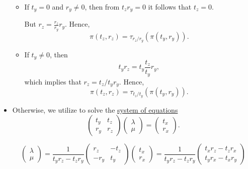 \begin{defproof}
\begin{itemize}
\begin{itemize}
      \item If \( t_y = 0 \) and \( r_y \neq 0 \), then from \( t_z r_y = 0 \) it follows that \( t_z = 0 \).

      But \( r_z = \frac {r_z} {r_y} r_y \). Hence,
      \begin{equation*}
        \pi(t_z, r_z) = \tau_{r_z / r_y}(\pi(t_y, r_y)).
      \end{equation*}

      \item If \( t_y \neq 0 \), then
      \begin{equation*}
        t_y r_z = t_y \frac {t_z} {t_y} r_y,
      \end{equation*}
      which implies that \( r_z = t_z / t_y r_y \). Hence,
      \begin{equation*}
        \pi(t_z, r_z) = \tau_{t_z / t_y}(\pi(t_y, r_y)).
      \end{equation*}
    \end{itemize}

    \item Otherwise, we utilize  to solve the \hyperref[rem:system_of_equations]{system of equations}
    \begin{equation*}
      \begin{pmatrix}
        t_y & t_z \\
        r_y & r_z
      \end{pmatrix}
      \begin{pmatrix}
        \lambda \\
        \mu
      \end{pmatrix}
      =
      \begin{pmatrix}
        t_x \\ r_x
      \end{pmatrix}.
    \end{equation*}

    \begin{equation*}
      \begin{pmatrix}
        \lambda \\
        \mu
      \end{pmatrix}
      =
      \frac 1 {t_y r_z - t_z r_y}
      \begin{pmatrix}
        r_z  & -t_z \\
        -r_y & t_y
      \end{pmatrix}
      \begin{pmatrix}
        t_x \\ r_x
      \end{pmatrix}
      =
      \frac 1 {t_y r_z - t_z r_y}
      \begin{pmatrix}
        t_x r_z - t_z r_x \\
        t_y r_x - t_x r_y
      \end{pmatrix}
    \end{equation*}


\end{itemize}
\end{defproof}
